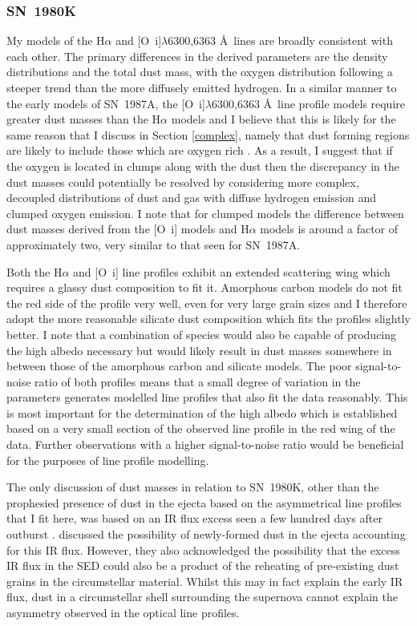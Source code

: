 \subsubsection{SN~1980K}
My models of the H$\alpha$ and [O~{\sc i}]$\lambda$6300,6363 \AA\ lines are broadly consistent with each other.  The primary differences in the derived parameters are the density distributions and the total dust mass, with the oxygen distribution following a steeper trend than the more diffusely emitted hydrogen.  In a similar manner to the early models of SN~1987A, the [O~{\sc i}]$\lambda$6300,6363 \AA\ line profile models require greater dust masses than the H$\alpha$ models and I believe that this is likely for the same reason that I discuss in Section \ref{complex}, namely that dust forming regions are likely to include those which are oxygen rich \citep{Kozma1998a}.  As a result, I suggest that if the oxygen is  located in clumps along with the dust then the discrepancy in the dust masses could potentially be resolved by considering more complex, decoupled distributions of dust and gas with diffuse hydrogen emission and clumped oxygen emission.  I note that for clumped models the difference between dust masses derived from the [O~{\sc i}] models and H$\alpha$ models is around a factor of approximately two, very similar to that seen for SN~1987A.

Both the H$\alpha$ and [O~{\sc i}] line profiles exhibit an extended scattering wing which requires a glassy dust composition to fit it.  Amorphous carbon models do not fit the red side of the profile very well, even for very large grain sizes and I therefore adopt the more reasonable silicate dust composition which fits the profiles slightly better.  I note that a combination of species would also be capable of producing the high albedo necessary but would likely result in dust masses somewhere in between those of the amorphous carbon and silicate models.  The poor signal-to-noise ratio of both profiles means that a small degree of variation in the parameters generates modelled line profiles that also fit the data reasonably.  This is most important for the determination of the high albedo which is established based on a very small section of the observed line profile in the red wing of the data.  Further observations with a higher signal-to-noise ratio would be beneficial for the purposes of line profile modelling. 

The only discussion of dust masses in relation to SN~1980K, other than the prophesied presence of dust in the ejecta based on the asymmetrical line profiles that I fit here, was based on an IR flux excess seen a few hundred days after outburst \citep{Dwek1983}.  \citet{Dwek1983} discussed the possibility of newly-formed dust in the ejecta accounting for this IR flux. However, they also acknowledged the possibility that the excess IR flux in the SED could also be a product of the reheating of pre-existing dust grains in the circumstellar material.  Whilst this may in fact explain the early IR flux,  dust in a circumstellar shell surrounding the supernova cannot explain the asymmetry observed in the optical line profiles.

